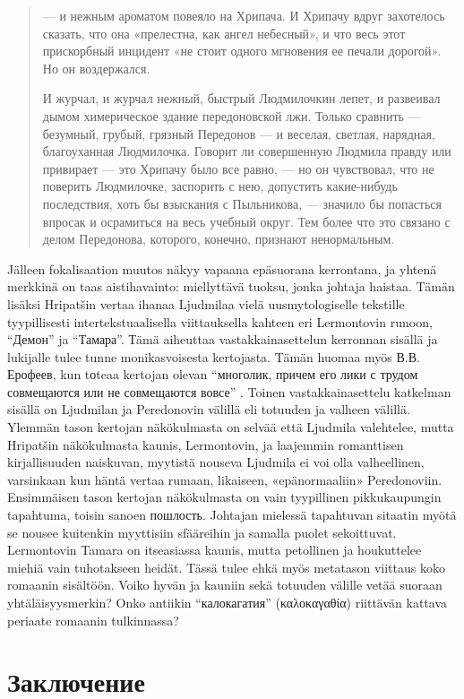 \documentclass[12pt,a4paper]{article}
\begin{document}
\begin{quote}

— и нежным ароматом повеяло на Хрипача. И Хрипачу
вдруг захотелось сказать, что она «прелестна, как ангел небесный», и
что весь этот прискорбный инцидент «не стоит одного мгновения ее 
печали дорогой». Но он воздержался.

И журчал, и журчал нежный, быстрый Людмилочкин лепет, и 
развеивал дымом химерическое здание передоновской лжи. Только 
сравнить — безумный, грубый, грязный Передонов — и веселая, светлая,
нарядная, благоуханная Людмилочка. Говорит ли совершенную 
Людмила правду или привирает — это Хрипачу было все равно, — но он 
чувствовал, что не поверить Людмилочке, заспорить с нею, допустить 
какие-нибудь последствия, хоть бы взыскания с Пыльникова, — значило
бы попасться впросак и осрамиться на весь учебный округ. Тем более
что это связано с делом Передонова, которого, конечно, признают 
ненормальным. \parencite[240]{sologub2004}
\end{quote}

Jälleen fokalisaation muutos näkyy vapaana epäsuorana kerrontana, ja yhtenä merkkinä on taas aistihavainto: miellyttävä tuoksu, jonka johtaja haistaa. %
Tämän lisäksi Hripatšin vertaa ihanaa Ljudmilaa vielä uusmytologiselle tekstille tyypillisesti intertekstuaalisella viittauksella kahteen eri Lermontovin runoon, \enquote{Демон} ja \enquote{Тамара}. Тämä aiheuttaa vastakkainasettelun kerronnan sisällä ja lukijalle tulee tunne monikasvoisesta kertojasta. Tämän huomaa myös В.В. Ерофеев, kun tоteaa kertojan olevan \enquote{многолик, причем его лики с трудом совмещаются или не совмещаются вовсе} \parencite[157]{jerofeev1985}. Toinen vastakkainasettelu katkelman sisällä on Ljudmilan ja Peredonovin välillä eli totuuden ja valheen välillä. Ylemmän tason kertojan näkökulmasta on selvää että Ljudmila valehtelee, mutta Hripatšin näkökulmasta kaunis, Lermontovin, ja laajemmin romanttisen kirjallisuuden naiskuvan, myytistä nouseva Ljudmila ei voi olla valheellinen, varsinkaan kun häntä vertaa rumaan, likaiseen, «epänormaaliin» Peredonoviin. Ensimmäisen tason kertojan näkökulmasta on vain tyypillinen pikkukaupungin tapahtuma, toisin sanoen пошлость. Johtajan mielessä tapahtuvan sitaatin myötä se nousee kuitenkin myyttisiin sfääreihin ja samalla puolet sekoittuvat. Lermontovin Tamara on itseasiassa kaunis, mutta petollinen ja houkuttelee miehiä vain tuhotakseen heidät. Tässä tulee ehkä myös metatason viittaus koko romaanin sisältöön. Voiko hyvän ja kauniin sekä totuuden välille vetää suoraan yhtäläisyysmerkin? Onko antiikin \enquote{калокагатия} (\foreignlanguage{greek}{καλοκαγαθία}) riittävän kattava periaate romaanin tulkinnassa?


\section{Заключение}



\printbibheading[heading=bibliography,title={Список использованной литературы}]
\printbibliography[heading=subbibliography,keyword={primary},title={Источники}]
\printbibliography[heading=subbibliography,notkeyword={primary},title={Исследовательская литература}]
\end{document}
